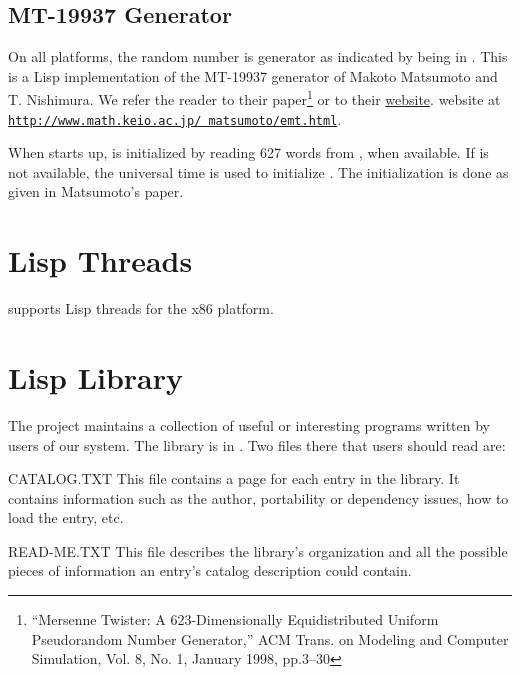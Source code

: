 \subsection{MT-19937 Generator}
On all platforms, the random number is  generator as indicated by
 being in .  This is a Lisp
implementation of the MT-19937 generator of Makoto Matsumoto and
T. Nishimura.  We refer the reader to their paper\footnote{``Mersenne
  Twister: A 623-Dimensionally Equidistributed Uniform Pseudorandom
  Number Generator,'' ACM Trans. on Modeling and Computer Simulation,
  Vol. 8, No. 1, January 1998, pp.3--30} or to
their
\ifpdf
\href{http://www.math.sci.hiroshima-u.ac.jp/~m-mat/MT/emt.html}{website}.
\else
website at
\href{http://www.math.keio.ac.jp/~matumoto/emt.html}{\texttt{http://www.math.keio.ac.jp/~matsumoto/emt.html}}.
\fi

When \cmucl{} starts up,  is initialized by
reading 627 words from , when available.  If
 is not available, the universal time is used to
initialize .  The initialization is done as given
in Matsumoto's paper.

\section{Lisp Threads}

\cmucl{} supports Lisp threads for the x86 platform.

\section{Lisp Library}
\label{lisp-lib}

The \cmucl{} project maintains a collection of useful or interesting
programs written by users of our system.  The library is in
.  Two files there that users should read are:
\begin{Lentry}

\item[CATALOG.TXT]
This file contains a page for each entry in the library.  It
contains information such as the author, portability or dependency issues, how
to load the entry, etc.

\item[READ-ME.TXT]
This file describes the library's organization and all the
possible pieces of information an entry's catalog description could contain.
\end{Lentry}


